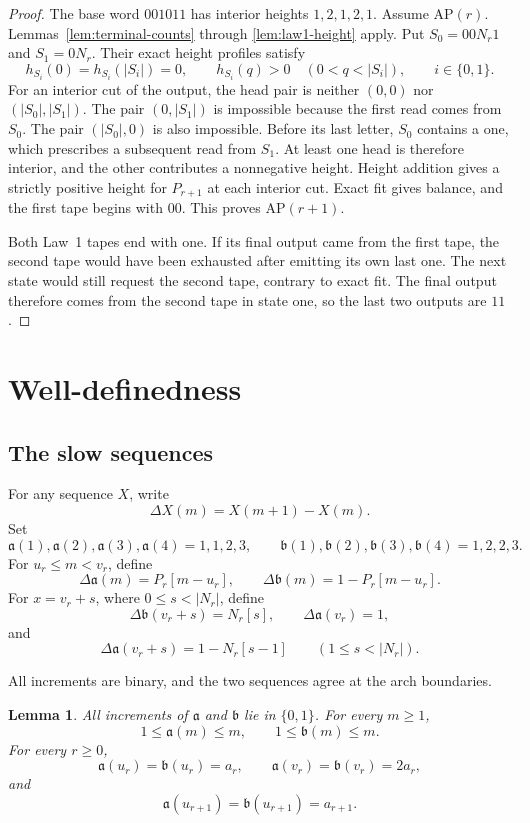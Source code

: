 \documentclass[11pt]{article}
\newtheorem{lemma}[theorem]{Lemma}
\theoremstyle{definition}
\theoremstyle{remark}
\begin{document}
\begin{proof}
The base word \(001011\) has interior heights \(1,2,1,2,1\).  Assume
\(\mathrm{AP}(r)\).  Lemmas~\ref{lem:terminal-counts} through
\ref{lem:law1-height}
apply.  Put \(S_0=00N_r1\) and \(S_1=0N_r\).  Their exact height profiles
satisfy
\[
 h_{S_i}(0)=h_{S_i}(|S_i|)=0,
 \qquad
 h_{S_i}(q)>0\quad(0<q<|S_i|),
 \qquad i\in\{0,1\}.
\]
For an interior cut of the output, the head pair is neither
\((0,0)\) nor \((|S_0|,|S_1|)\).  The pair \((0,|S_1|)\) is impossible
because the first read comes from \(S_0\).  The pair \((|S_0|,0)\) is also
impossible.  Before its last letter, \(S_0\) contains a one, which prescribes
a subsequent read from \(S_1\).  At least one head is therefore interior,
and the other contributes a nonnegative height.  Height addition gives a
strictly positive height for \(P_{r+1}\) at each interior cut.
Exact fit gives balance, and the first tape begins with \(00\).  This proves
\(\mathrm{AP}(r+1)\).

Both Law~1 tapes end with one.  If its final output came from the first tape,
the second tape would have been exhausted after emitting its own last one.
The next state would still request the second tape, contrary to exact fit.
The final output therefore comes from the second tape in state one, so the
last two outputs are \(11\).
\end{proof}

\section{Well-definedness}

\subsection{The slow sequences}

For any sequence \(X\), write
\[
 \Delta X(m)=X(m+1)-X(m).
\]
Set
\[
 \mathfrak a(1),\mathfrak a(2),\mathfrak a(3),\mathfrak a(4)=1,1,2,3,
 \qquad
 \mathfrak b(1),\mathfrak b(2),\mathfrak b(3),\mathfrak b(4)=1,2,2,3.
\]
For \(u_r\leq m<v_r\), define
\[
 \Delta \mathfrak a(m)=P_r[m-u_r],
 \qquad \Delta \mathfrak b(m)=1-P_r[m-u_r].
\]
For \(x=v_r+s\), where \(0\leq s<|N_r|\), define
\[
 \Delta \mathfrak b(v_r+s)=N_r[s],
 \qquad \Delta \mathfrak a(v_r)=1,
\]
and
\[
 \Delta \mathfrak a(v_r+s)=1-N_r[s-1]
 \qquad(1\leq s<|N_r|).
\]

All increments are binary, and the two sequences agree at the arch boundaries.
\begin{lemma}
\label{lem:endpoints}
All increments of \(\mathfrak a\) and \(\mathfrak b\) lie in \(\{0,1\}\).  For every \(m\geq1\),
\[
 1\leq \mathfrak a(m)\leq m,
 \qquad 1\leq \mathfrak b(m)\leq m.
\]
For every \(r\geq0\),
\[
 \mathfrak a(u_r)=\mathfrak b(u_r)=a_r,
 \qquad \mathfrak a(v_r)=\mathfrak b(v_r)=2a_r,
\]
and
\[
 \mathfrak a(u_{r+1})=\mathfrak b(u_{r+1})=a_{r+1}.
\]
\end{lemma}
\end{document}

